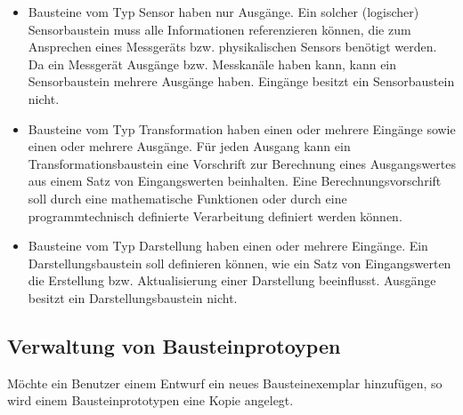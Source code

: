 \documentclass[parskip=full]{scrartcl}
\begin{document}
\begin{itemize}
	
	\item Bausteine vom Typ Sensor haben nur Ausgänge. Ein solcher (logischer) Sensorbaustein muss alle Informationen referenzieren können, die zum Ansprechen eines Messgeräts bzw. physikalischen Sensors benötigt werden. Da ein Messgerät Ausgänge bzw. Messkanäle haben kann, kann ein Sensorbaustein mehrere Ausgänge haben. Eingänge besitzt ein Sensorbaustein nicht. 
	
	\item Bausteine vom Typ Transformation haben einen oder mehrere Eingänge sowie einen oder mehrere Ausgänge. Für jeden Ausgang kann  ein Transformationsbaustein eine Vorschrift zur Berechnung eines Ausgangswertes aus einem Satz von Eingangswerten beinhalten. Eine Berechnungsvorschrift soll durch eine mathematische Funktionen oder durch eine programmtechnisch definierte Verarbeitung definiert werden können.
	
	\item Bausteine vom Typ Darstellung haben einen oder mehrere Eingänge. Ein Darstellungsbaustein soll definieren können, wie ein Satz von Eingangswerten die Erstellung bzw. Aktualisierung einer Darstellung beeinflusst. Ausgänge besitzt ein Darstellungsbaustein nicht.
	
\end{itemize}



\subsection{Verwaltung von Bausteinprotoypen}

Möchte ein Benutzer einem Entwurf ein neues Bausteinexemplar hinzufügen, so wird einem \gls{Bausteinprototyp}en eine Kopie angelegt.
\end{document}
